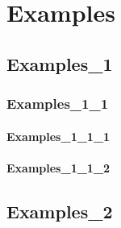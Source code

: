 \chapter{Examples}
\section{Examples_1}
\subsection{Examples_1_1}
\subsubsection{Examples_1_1_1}
\lipsum
\subsubsection{Examples_1_1_2}
\lipsum
\section{Examples_2}
\lipsum